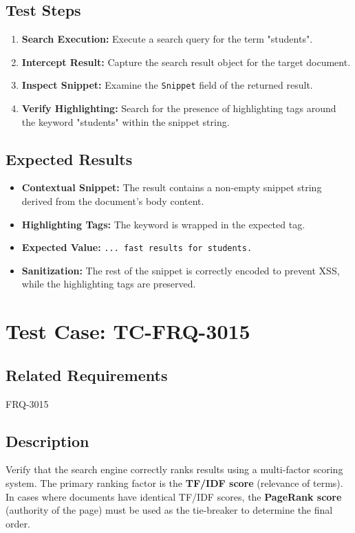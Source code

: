 \documentclass{article}
\begin{document}
\subsection*{Test Steps}
\begin{enumerate}
  \item \textbf{Search Execution:} Execute a search query for the term "students".
  \item \textbf{Intercept Result:} Capture the search result object for the target document.
  \item \textbf{Inspect Snippet:} Examine the \texttt{Snippet} field of the returned result.
  \item \textbf{Verify Highlighting:} Search for the presence of highlighting tags around the keyword "students" within the snippet string.
\end{enumerate}

\subsection*{Expected Results}
\begin{itemize}
  \item \textbf{Contextual Snippet:} The result contains a non-empty snippet string derived from the document's body content.
  \item \textbf{Highlighting Tags:} The keyword is wrapped in the expected tag.
  \item \textbf{Expected Value:} \texttt{... fast results for students.}
  \item \textbf{Sanitization:} The rest of the snippet is correctly encoded to prevent XSS, while the highlighting tags are preserved.
\end{itemize}

\section{Test Case: TC-FRQ-3015}
\subsection*{Related Requirements}
FRQ-3015

\subsection*{Description}
Verify that the search engine correctly ranks results using a multi-factor scoring system. 
The primary ranking factor is the \textbf{TF/IDF score} (relevance of terms). In cases where 
documents have identical TF/IDF scores, the \textbf{PageRank score} (authority of the page) must be 
used as the tie-breaker to determine the final order.
\end{document}
